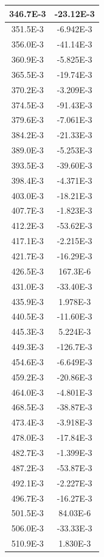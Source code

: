 \documentclass[english, 12pt, a4paper]{ifimaster}
\begin{document}
\begin{appendices}
\begin{center}
\begin{longtable}[htbp]{|c|c|}
\hline
  346.7E-3 & -23.12E-3 \\
\hline
  351.5E-3 & -6.942E-3 \\
\hline
  356.0E-3 & -41.14E-3 \\
\hline
  360.9E-3 & -5.825E-3 \\
\hline
  365.5E-3 & -19.74E-3 \\
\hline
  370.2E-3 & -3.209E-3 \\
\hline
  374.5E-3 & -91.43E-3 \\
\hline
  379.6E-3 & -7.061E-3 \\
\hline
  384.2E-3 & -21.33E-3 \\
\hline
  389.0E-3 & -5.253E-3 \\
\hline
  393.5E-3 & -39.60E-3 \\
\hline
  398.4E-3 & -4.371E-3 \\
\hline
  403.0E-3 & -18.21E-3 \\
\hline
  407.7E-3 & -1.823E-3 \\
\hline
  412.2E-3 & -53.62E-3 \\
\hline
  417.1E-3 & -2.215E-3 \\
\hline
  421.7E-3 & -16.29E-3 \\
\hline
  426.5E-3 & 167.3E-6 \\
\hline
  431.0E-3 & -33.40E-3 \\
\hline
  435.9E-3 & 1.978E-3 \\
\hline
  440.5E-3 & -11.60E-3 \\
\hline
  445.3E-3 & 5.224E-3 \\
\hline
  449.3E-3 & -126.7E-3 \\
\hline
  454.6E-3 & -6.649E-3 \\
\hline
  459.2E-3 & -20.86E-3 \\
\hline
  464.0E-3 & -4.801E-3 \\
\hline
  468.5E-3 & -38.87E-3 \\
\hline
  473.4E-3 & -3.918E-3 \\
\hline
  478.0E-3 & -17.84E-3 \\
\hline
  482.7E-3 & -1.399E-3 \\
\hline
  487.2E-3 & -53.87E-3 \\
\hline
  492.1E-3 & -2.227E-3 \\
\hline
  496.7E-3 & -16.27E-3 \\
\hline
  501.5E-3 & 84.03E-6 \\
\hline
  506.0E-3 & -33.33E-3 \\
\hline
  510.9E-3 & 1.830E-3 \\

\end{longtable}
\end{center}
\end{appendices}
\end{document}
